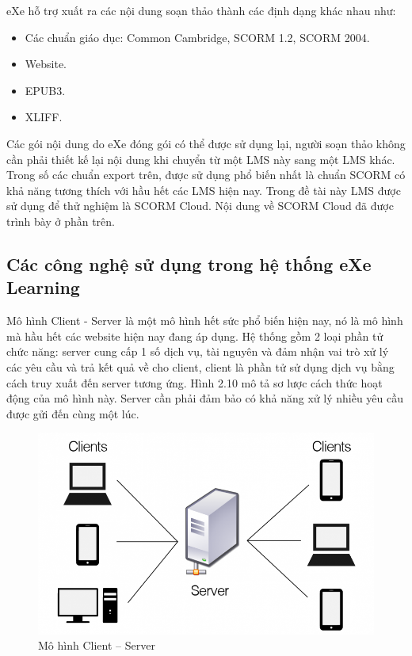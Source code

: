 eXe hỗ trợ xuất ra các nội dung soạn thảo thành các định dạng khác nhau như:

\begin{itemize}
	\item Các chuẩn giáo dục: Common Cambridge, SCORM 1.2, SCORM 2004.
	\item Website.
	\item EPUB3.
	\item XLIFF.
\end{itemize}

Các gói nội dung do eXe đóng gói có thể được sử dụng lại, người soạn thảo không cần phải thiết kế lại nội dung khi chuyển từ một LMS này sang một LMS khác. Trong số các chuẩn export trên, được sử dụng phổ biến nhất là chuẩn SCORM có khả năng tương thích với hầu hết các LMS hiện nay. Trong đề tài này LMS được sử dụng để thử nghiệm là SCORM Cloud. Nội dung về SCORM Cloud đã được trình bày ở phần trên.


\subsection{Các công nghệ sử dụng trong hệ thống eXe Learning}
Mô hình Client - Server là một mô hình hết sức phổ biến hiện nay, nó là mô hình mà hầu hết các website hiện nay đang áp dụng. Hệ thống gồm 2 loại phần tử chức năng: server cung cấp 1 số dịch vụ, tài nguyên và đảm nhận vai trò xử lý các yêu cầu và trả kết quả về cho client, client là phần tử sử dụng dịch vụ bằng cách truy xuất đến server tương ứng. Hình 2.10 mô tả sơ lược cách thức hoạt động của mô hình này. Server cần phải đảm bảo có khả năng xử lý nhiều yêu cầu được gửi đến cùng một lúc.\\


\begin{center}
	\begin{figure}[htp]
		\begin{center}
			\includegraphics[width=16cm]{Chapter2/Pictures/picture210.png}
		\end{center}
		\caption{Mô hình Client – Server}
		\label{refpicture210}
	\end{figure}
\end{center}

